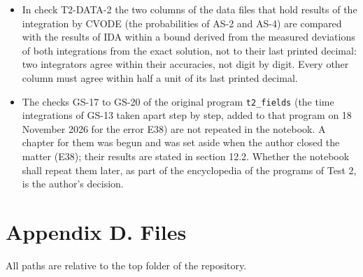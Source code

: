 \documentclass[
  10pt,
]{article}
\begin{document}
\begin{itemize}
  The evaluation in the front end is made in three calls (start the
  kernel; queue the notebook; finish), and the kernel records its
  progress in a file (error E37): a run that stops can then be located
  without the screen, and nothing has to be asked of the author.
\item
  In check T2-DATA-2 the two columns of the data files that hold results
  of the integration by CVODE (the probabilities of AS-2 and AS-4) are
  compared with the results of IDA within a bound derived from the
  measured deviations of both integrations from the exact solution, not
  to their last printed decimal: two integrators agree within their
  accuracies, not digit by digit. Every other column must agree within
  half a unit of its last printed decimal.
\item
  The checks GS-17 to GS-20 of the original program \texttt{t2\_fields}
  (the time integrations of GS-13 taken apart step by step, added to
  that program on 18 November 2026 for the error E38) are not repeated
  in the notebook. A chapter for them was begun and was set aside when
  the author closed the matter (E38); their results are stated in
  section 12.2. Whether the notebook shall repeat them later, as part of
  the encyclopedia of the programs of Test 2, is the author's decision.
\end{itemize}

\hypertarget{appendix-d.-files}{%
\section{Appendix D. Files}\label{appendix-d.-files}}

All paths are relative to the top folder of the repository.
\end{document}
